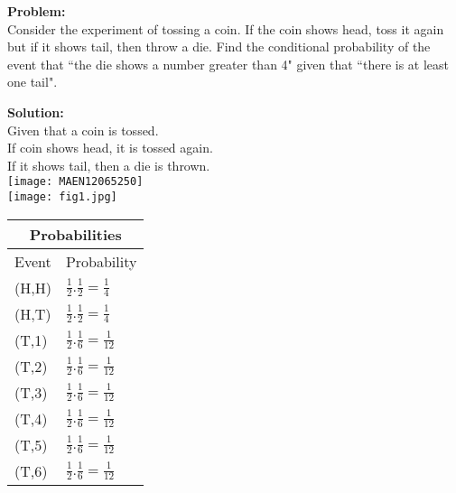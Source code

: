 \documentclass[journal,12pt,twocolumn]{IEEEtran}
\begin{document}
\maketitle
\newpage
\bigskip
\item{\textbf{Problem:}}
\\
Consider the experiment of tossing a coin. If the coin shows head, toss it again but if it shows tail, then throw a die. Find the conditional probability of the event that ``the die shows a number greater than 4" given that ``there is at least one tail".
\item{\textbf{Solution:}}
\\
Given that a coin is tossed.
\\If coin shows head, it is tossed again.
\\If it shows tail, then a die is thrown.
\\
\texttt{[image: MAEN12065250]}
\\
\texttt{[image: fig1.jpg]}


\setlength{\arrayrulewidth}{1mm}
\setlength{\tabcolsep}{10pt}
\renewcommand{\arraystretch}{2}
{
\begin{tabular}{ |p{3cm}|p{3cm}|  }
\hline
\multicolumn{2}{|c|}{Probabilities } \\
\hline
Event &  Probability\\
\hline
(H,H) & $\frac{1}{2}.\frac{1}{2}=\frac{1}{4}$\\
(H,T) & $\frac{1}{2}.\frac{1}{2}=\frac{1}{4}$\\
(T,1) & $\frac{1}{2}.\frac{1}{6}=\frac{1}{12}$\\
(T,2) & $\frac{1}{2}.\frac{1}{6}=\frac{1}{12}$\\
(T,3) & $\frac{1}{2}.\frac{1}{6}=\frac{1}{12}$\\
(T,4) & $\frac{1}{2}.\frac{1}{6}=\frac{1}{12}$\\
(T,5) & $\frac{1}{2}.\frac{1}{6}=\frac{1}{12}$\\
(T,6) & $\frac{1}{2}.\frac{1}{6}=\frac{1}{12}$\\
\hline
\end{tabular}
}
\\\\
\end{document}
